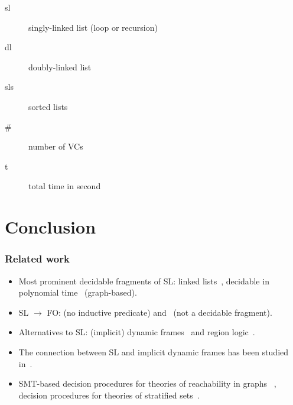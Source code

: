 \documentclass{beamer}
\begin{document}
\begin{frame}
\begin{description}
\item[sl] singly-linked list (loop or recursion)
\item[dl] doubly-linked list
\item[sls] sorted lists
\end{description}
\begin{description}
\item[\#] number of VCs
\item[t] total time in second
\end{description}
\end{frame}

\section*{Conclusion}

\begin{frame}
  \frametitle{Related work}
{\small
  \begin{itemize}
  \item Most prominent decidable fragments of SL: linked lists~\cite{BerdineETAL04DecidableFragmentSeparationLogic}, decidable in polynomial time~\cite{CooketALFragmentSepLog} (graph-based).

\item SL $\rightarrow$ FO: \cite{Calcagno05fromseparation} (no inductive predicate) and~\cite{bobot12icfem} (not a decidable fragment).

\item Alternatives to SL: (implicit) dynamic frames~\cite{DBLP:journals/fac/Kassios11} and region logic~\cite{DBLP:conf/ecoop/BanerjeeNR08,DBLP:conf/vmcai/RosenbergBN12}.
\item The connection between SL and implicit dynamic frames has been studied in~\cite{DBLP:journals/corr/abs-1203-6859}.

\item SMT-based decision procedures for theories of reachability in graphs~\cite{DBLP:conf/popl/LahiriQ08, WiesMK11, TotlaWies13CompleteInsterpolation}
, decision procedures for theories of stratified sets~\cite{Zarba04CombiningSetsElements}.

\end{itemize}
}
\end{frame}
\end{document}
